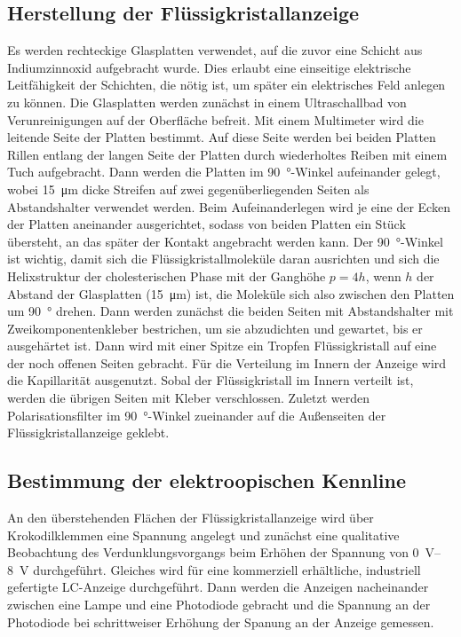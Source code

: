 \documentclass[
	a4paper,
	12pt,
	pagesize,
	ngerman
]{scrartcl}
\begin{document}
	\subsection{Herstellung der Flüssigkristallanzeige}
	Es werden rechteckige Glasplatten verwendet, auf die zuvor eine Schicht aus Indiumzinnoxid aufgebracht wurde.
	Dies erlaubt eine einseitige elektrische Leitfähigkeit der Schichten, die nötig ist, um später ein elektrisches Feld anlegen zu können.
	Die Glasplatten werden zunächst in einem Ultraschallbad von Verunreinigungen auf der Oberfläche befreit.
	Mit einem Multimeter wird die leitende Seite der Platten bestimmt.
	Auf diese Seite werden bei beiden Platten Rillen entlang der langen Seite der Platten durch wiederholtes Reiben mit einem Tuch aufgebracht.
	Dann werden die Platten im \SI{90}{\degree}-Winkel aufeinander gelegt, wobei \SI{15}{\micro \meter} dicke Streifen auf zwei gegenüberliegenden Seiten als Abstandshalter verwendet werden.
	Beim Aufeinanderlegen wird je eine der Ecken der Platten aneinander ausgerichtet, sodass von beiden Platten ein Stück übersteht, an das später der Kontakt angebracht werden kann.
	Der \SI{90}{\degree}-Winkel ist wichtig, damit sich die Flüssigkristallmoleküle daran ausrichten und sich die Helixstruktur der cholesterischen Phase mit der Ganghöhe $p=4h$, wenn $h$ der Abstand der Glasplatten (\SI{15}{\micro \meter}) ist, die Moleküle sich also zwischen den Platten um \SI{90}{\degree} drehen.
	Dann werden zunächst die beiden Seiten mit Abstandshalter mit Zweikomponentenkleber bestrichen, um sie abzudichten und gewartet, bis er ausgehärtet ist.
	Dann wird mit einer Spitze ein Tropfen Flüssigkristall auf eine der noch offenen Seiten gebracht. Für die Verteilung im Innern der Anzeige wird die Kapillarität ausgenutzt.
  Sobal der Flüssigkristall im Innern verteilt ist, werden die übrigen Seiten mit Kleber verschlossen.
	Zuletzt werden Polarisationsfilter im \SI{90}{\degree}-Winkel zueinander auf die Außenseiten der Flüssigkristallanzeige geklebt.

	\subsection{Bestimmung der elektroopischen Kennline}
	An den überstehenden Flächen der Flüssigkristallanzeige wird über Krokodilklemmen eine Spannung angelegt und zunächst eine qualitative Beobachtung des Verdunklungsvorgangs beim Erhöhen der Spannung von \SIrange{0}{8}{V} durchgeführt.
	Gleiches wird für eine kommerziell erhältliche, industriell gefertigte LC-Anzeige durchgeführt.
	Dann werden die Anzeigen nacheinander zwischen eine Lampe und eine Photodiode gebracht und die Spannung an der Photodiode bei schrittweiser Erhöhung der Spanung an der Anzeige gemessen.
\end{document}
